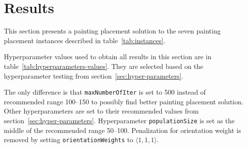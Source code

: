 \clearpage%
\newpage


\section{Results}\label{sec:results}
This section presents a painting placement solution to the seven painting placement instances described in table~\ref{tab:instances}.

Hyperparameter values used to obtain all results in this section are in table~\ref{tab:hyperparameters-values}.
They are selected based on the hyperparameter testing from section~\ref{sec:hyper-parameters}.

The only difference is that \verb|maxNumberOfIter| is set to 500 instead of recommended range \numrange{100}{150} to possibly find better painting placement solution.
Other hyperparameters are set to their recommended values from section~\ref{sec:hyper-parameters}.
Hyperparameter \verb|populationSize| is set as the middle of the recommended range \numrange{50}{100}.
Penalization for orientation weight is removed by setting \verb|orientationWeights| to $\langle 1,1,1\rangle$.


